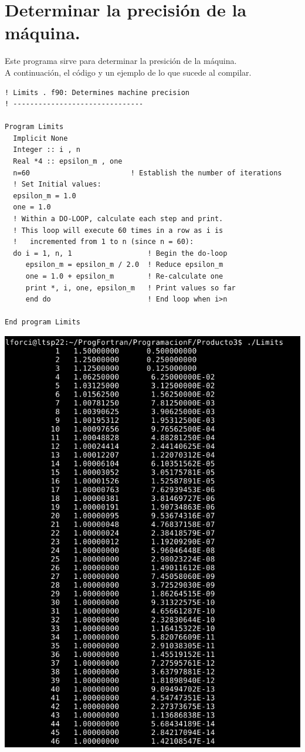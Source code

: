 \documentclass[10pt]{article}
\begin{document}
\section{Determinar la precisión de la máquina.}
Este programa sirve para determinar la presición de la máquina.\\
A continuación, el código y un ejemplo de lo que sucede al compilar.
\begin{verbatim}
! Limits . f90: Determines machine precision
! -------------------------------

Program Limits
  Implicit None
  Integer :: i , n
  Real *4 :: epsilon_m , one
  n=60                        ! Establish the number of iterations
  ! Set Initial values:
  epsilon_m = 1.0
  one = 1.0
  ! Within a DO-LOOP, calculate each step and print.
  ! This loop will execute 60 times in a row as i is
  !   incremented from 1 to n (since n = 60):
  do i = 1, n, 1                  ! Begin the do-loop
     epsilon_m = epsilon_m / 2.0  ! Reduce epsilon_m
     one = 1.0 + epsilon_m        ! Re-calculate one
     print *, i, one, epsilon_m   ! Print values so far
     end do                       ! End loop when i>n

End program Limits

\end{verbatim}
\includegraphics[scale=0.6]{Limits}
\end{document}
